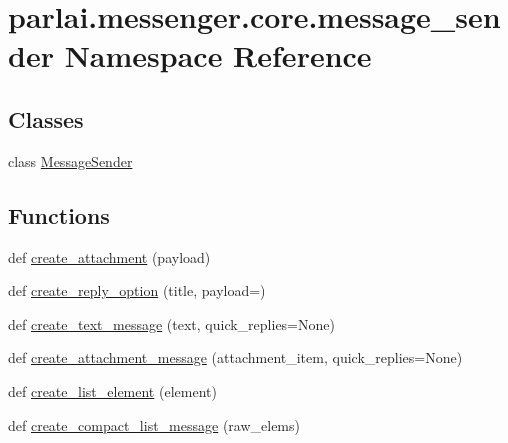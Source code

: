 \hypertarget{namespaceparlai_1_1messenger_1_1core_1_1message__sender}{}\section{parlai.\+messenger.\+core.\+message\+\_\+sender Namespace Reference}
\label{namespaceparlai_1_1messenger_1_1core_1_1message__sender}
\subsection*{Classes}
\begin{DoxyCompactItemize}
\item 
class \hyperlink{classparlai_1_1messenger_1_1core_1_1message__sender_1_1MessageSender}{Message\+Sender}
\end{DoxyCompactItemize}
\subsection*{Functions}
\begin{DoxyCompactItemize}
\item 
def \hyperlink{namespaceparlai_1_1messenger_1_1core_1_1message__sender_ae26a16d26bdd28795220ad9ef76c96fd}{create\+\_\+attachment} (payload)
\item 
def \hyperlink{namespaceparlai_1_1messenger_1_1core_1_1message__sender_ad1b8681b56d567251598624cf3efa587}{create\+\_\+reply\+\_\+option} (title, payload=\textquotesingle{}\textquotesingle{})
\item 
def \hyperlink{namespaceparlai_1_1messenger_1_1core_1_1message__sender_a5476d988fc16eb2cf726dc63e72fb0f5}{create\+\_\+text\+\_\+message} (text, quick\+\_\+replies=None)
\item 
def \hyperlink{namespaceparlai_1_1messenger_1_1core_1_1message__sender_a5bd9c5675042d0a3a4fc808bab365548}{create\+\_\+attachment\+\_\+message} (attachment\+\_\+item, quick\+\_\+replies=None)
\item 
def \hyperlink{namespaceparlai_1_1messenger_1_1core_1_1message__sender_a0fb8b2849a9c5d3e0db470a399358b5b}{create\+\_\+list\+\_\+element} (element)
\item 
def \hyperlink{namespaceparlai_1_1messenger_1_1core_1_1message__sender_a4359c421913c537e0003032b1d1b79b5}{create\+\_\+compact\+\_\+list\+\_\+message} (raw\+\_\+elems)
\end{DoxyCompactItemize}
